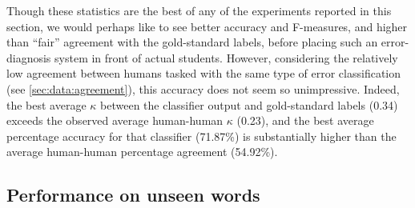 \documentclass[a4paper]{article}
\begin{document}
		Though these statistics are the best of any of the experiments reported in this section, we would perhaps like to see better accuracy and F-measures, and higher than ``fair'' agreement \cite{Landis1977} with the gold-standard labels, before placing such an error-diagnosis system in front of actual students.
		However, considering the relatively low agreement between humans tasked with the same type of error classification (see \cref{sec:data:agreement}), this accuracy does not seem so unimpressive.
		Indeed, the best average $\kappa$ between the classifier output and gold-standard labels (0.34) exceeds the observed average human-human $\kappa$ (0.23), and the best average percentage accuracy for that classifier (71.87\%) is substantially higher than the average human-human percentage agreement (54.92\%). 
		
		
		\subsection{Performance on unseen words}
		\label{sec:results:words}
		
\end{document}
